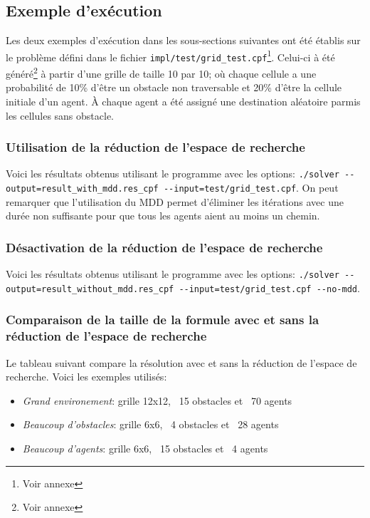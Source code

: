 \documentclass[french, 12pt, letterpaper]{article}
\theoremstyle{definition}
\theoremstyle{proposition}
\theoremstyle{example}
\begin{document}
    

    \subsection{Exemple d'exécution}
    \label{sec:example}

    Les deux exemples d'exécution dans les sous-sections suivantes ont été établis sur le problème défini dans le fichier
    \lstinline{impl/test/grid_test.cpf}\footnote{Voir annexe }. Celui-ci à été généré\footnote{Voir annexe } 
    à partir d'une grille de taille 10 par 10;
    où chaque cellule a une probabilité de 10\% d'être un obstacle non traversable et 20\% d'être la cellule initiale d'un agent.
    À chaque agent a été assigné une destination aléatoire parmis les cellules sans obstacle.

    \subsubsection{Utilisation de la réduction de l'espace de recherche}

    Voici les résultats obtenus utilisant le programme avec les options: \lstinline{./solver --output=result_with_mdd.res_cpf --input=test/grid_test.cpf}.
    On peut remarquer que l'utilisation du MDD permet d'éliminer les itérations avec une durée non suffisante pour que tous les agents aient au moins un chemin.

    

    \subsubsection{Désactivation de la réduction de l'espace de recherche}

    Voici les résultats obtenus utilisant le programme avec les options: \lstinline{./solver --output=result_without_mdd.res_cpf --input=test/grid_test.cpf --no-mdd}.

    

    \subsubsection{Comparaison de la taille de la formule avec et sans la réduction de l'espace de recherche}
    \label{sec:compartaille}

    Le tableau suivant compare la résolution avec et sans la réduction de l'espace de recherche. Voici les exemples utilisés:
    \begin{itemize}
        \item \emph{Grand environement}: grille 12x12, ~15 obstacles et ~70 agents
        \item \emph{Beaucoup d'obstacles}: grille 6x6, ~4 obstacles et ~28 agents
        \item \emph{Beaucoup d'agents}: grille 6x6, ~15 obstacles et ~4 agents
    \end{itemize}
    
\end{document}
